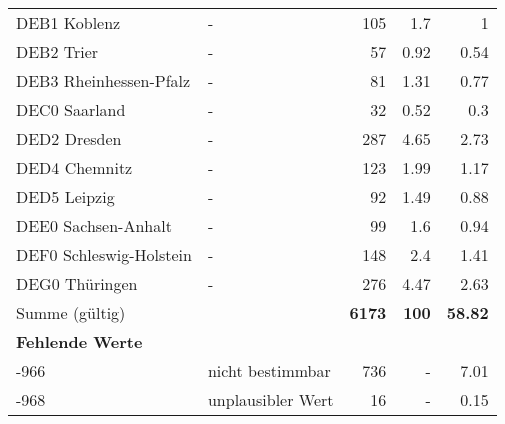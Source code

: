 \begin{longtable}{Xlrrr}
        \multicolumn{1}{X}{DEB1 Koblenz} & - & \num{105} & \num[round-mode=places,round-precision=2]{1.7} & \num[round-mode=places,round-precision=2]{1} \\
        \multicolumn{1}{X}{DEB2 Trier} & - & \num{57} & \num[round-mode=places,round-precision=2]{0.92} & \num[round-mode=places,round-precision=2]{0.54} \\
        \multicolumn{1}{X}{DEB3 Rheinhessen-Pfalz} & - & \num{81} & \num[round-mode=places,round-precision=2]{1.31} & \num[round-mode=places,round-precision=2]{0.77} \\
        \multicolumn{1}{X}{DEC0 Saarland} & - & \num{32} & \num[round-mode=places,round-precision=2]{0.52} & \num[round-mode=places,round-precision=2]{0.3} \\
        \multicolumn{1}{X}{DED2 Dresden} & - & \num{287} & \num[round-mode=places,round-precision=2]{4.65} & \num[round-mode=places,round-precision=2]{2.73} \\
        \multicolumn{1}{X}{DED4 Chemnitz} & - & \num{123} & \num[round-mode=places,round-precision=2]{1.99} & \num[round-mode=places,round-precision=2]{1.17} \\
        \multicolumn{1}{X}{DED5 Leipzig} & - & \num{92} & \num[round-mode=places,round-precision=2]{1.49} & \num[round-mode=places,round-precision=2]{0.88} \\
        \multicolumn{1}{X}{DEE0 Sachsen-Anhalt} & - & \num{99} & \num[round-mode=places,round-precision=2]{1.6} & \num[round-mode=places,round-precision=2]{0.94} \\
        \multicolumn{1}{X}{DEF0 Schleswig-Holstein} & - & \num{148} & \num[round-mode=places,round-precision=2]{2.4} & \num[round-mode=places,round-precision=2]{1.41} \\
        \multicolumn{1}{X}{DEG0 Thüringen} & - & \num{276} & \num[round-mode=places,round-precision=2]{4.47} & \num[round-mode=places,round-precision=2]{2.63} \\
     \midrule
      \multicolumn{2}{l}{Summe (gültig)} & \textbf{\num{6173}} &
      \textbf{\num{100}} &
         \textbf{\num[round-mode=places,round-precision=2]{58.82}} \\
     \multicolumn{5}{l}{\textbf{Fehlende Werte}}\\
       -966 & nicht bestimmbar & \num{736} & - & \num[round-mode=places,round-precision=2]{7.01} \\

       -968 & unplausibler Wert & \num{16} & - & \num[round-mode=places,round-precision=2]{0.15} \\


\end{longtable}

